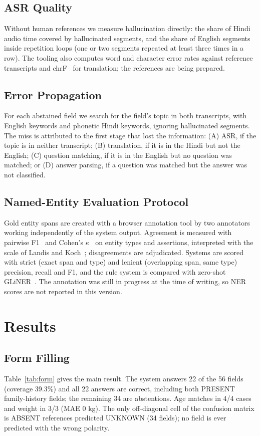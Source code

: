 \documentclass[conference]{IEEEtran}
\begin{document}
\subsection{ASR Quality}
Without human references we measure hallucination directly: the share of Hindi audio time covered by hallucinated segments, and the share of English segments inside repetition loops (one or two segments repeated at least three times in a row). The tooling also computes word and character error rates against reference transcripts and chrF~\cite{chrf} for translation; the references are being prepared.

\subsection{Error Propagation}
For each abstained field we search for the field's topic in both transcripts, with English keywords and phonetic Hindi keywords, ignoring hallucinated segments. The miss is attributed to the first stage that lost the information: (A) ASR, if the topic is in neither transcript; (B) translation, if it is in the Hindi but not the English; (C) question matching, if it is in the English but no question was matched; or (D) answer parsing, if a question was matched but the answer was not classified.

\subsection{Named-Entity Evaluation Protocol}
Gold entity spans are created with a browser annotation tool by two annotators working independently of the system output. Agreement is measured with pairwise F1~\cite{hripcsak} and Cohen's $\kappa$~\cite{cohen} on entity types and assertions, interpreted with the scale of Landis and Koch~\cite{landis}; disagreements are adjudicated. Systems are scored with strict (exact span and type) and lenient (overlapping span, same type) precision, recall and F1, and the rule system is compared with zero-shot GLiNER~\cite{gliner}. The annotation was still in progress at the time of writing, so NER scores are not reported in this version.

\section{Results}
\subsection{Form Filling}
Table~\ref{tab:form} gives the main result. The system answers 22 of the 56 fields (coverage 39.3\%) and all 22 answers are correct, including both PRESENT family-history fields; the remaining 34 are abstentions. Age matches in 4/4 cases and weight in 3/3 (MAE 0 kg). The only off-diagonal cell of the confusion matrix is ABSENT references predicted UNKNOWN (34 fields); no field is ever predicted with the wrong polarity.
\end{document}
